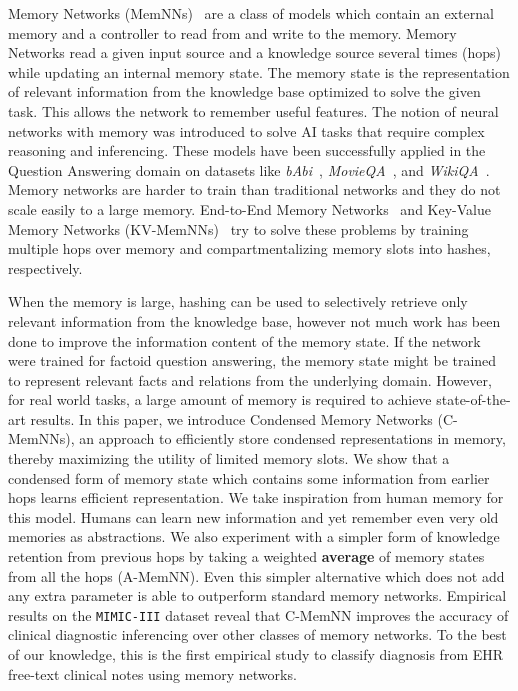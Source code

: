     Memory Networks (MemNNs)~\cite{NIPS2015_end_to_end,DBLP:journals/corr/WestonCB14} are a class of models which contain an external memory and a controller to read from and write to the memory. Memory Networks read a given input source and a knowledge source several times (hops) while updating an internal memory state. The memory state is the representation of relevant information from the knowledge base optimized to solve the given task. This allows the network to remember useful features. The notion of neural networks with memory was introduced to solve AI tasks that require complex reasoning and inferencing. These models have been successfully applied in the Question Answering domain on datasets like \emph{bAbi}~\cite{weston2015towards}, \emph{MovieQA}~\cite{tapaswi2015movieqa}, and \emph{WikiQA}~\cite{NIPS2015_end_to_end,DBLP:journals/corr/MillerFDKBW16}. Memory networks are harder to train than traditional networks and they do not scale easily to a large memory. End-to-End Memory Networks~\cite{NIPS2015_end_to_end} and Key-Value Memory Networks (KV-MemNNs)~\cite{DBLP:journals/corr/MillerFDKBW16} try to solve these problems by training multiple hops over memory and compartmentalizing memory slots into hashes, respectively. 
    
    When the memory is large, hashing can be used to selectively retrieve only relevant information from the knowledge base, however not much work has been done to improve the information content of the memory state. If the network were trained for factoid question answering, the memory state might be trained to represent relevant facts and relations from the underlying domain. However, for real world tasks, a large amount of memory is required to achieve state-of-the-art results. In this paper, we introduce Condensed Memory Networks (C-MemNNs), an approach to efficiently store condensed representations in memory, thereby maximizing the utility of limited memory slots. We show that a condensed form of memory state which contains some information from earlier hops learns efficient representation. We take inspiration from human memory for this model. Humans can learn new information and yet remember even very old memories as abstractions. We also experiment with a simpler form of knowledge retention from previous hops by taking a weighted \textbf{average} of memory states from all the hops (A-MemNN). Even this simpler alternative which does not add any extra parameter is able to outperform standard memory networks. Empirical results on the \texttt{\texttt{MIMIC-III}} dataset reveal that C-MemNN improves the accuracy of clinical diagnostic inferencing over other classes of memory networks. To the best of our knowledge, this is the first empirical study to classify diagnosis from EHR free-text clinical notes using memory networks.
    
